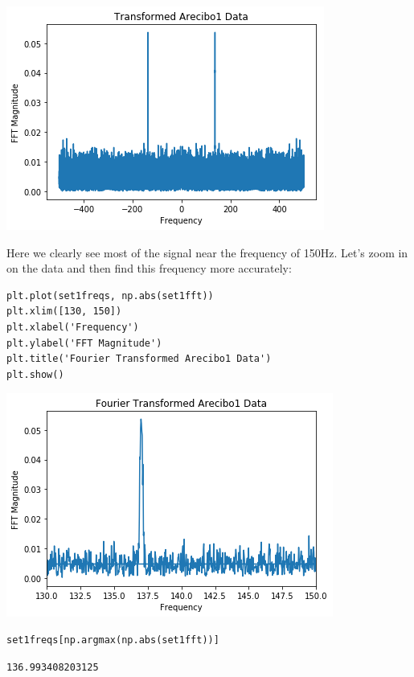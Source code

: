 \documentclass[11pt]{article}
\begin{document}
\includegraphics[width=.9\linewidth]{./obipy-resources/333QAN.png}

Here we clearly see most of the signal near the frequency of 150Hz. Let's zoom
in on the data and then find this frequency more accurately:

\begin{verbatim}
plt.plot(set1freqs, np.abs(set1fft))
plt.xlim([130, 150])
plt.xlabel('Frequency')
plt.ylabel('FFT Magnitude')
plt.title('Fourier Transformed Arecibo1 Data')
plt.show()
\end{verbatim}

\includegraphics[width=.9\linewidth]{./obipy-resources/333dKT.png}

\begin{verbatim}
set1freqs[np.argmax(np.abs(set1fft))]
\end{verbatim}

\begin{verbatim}
136.993408203125
\end{verbatim}
\end{document}
